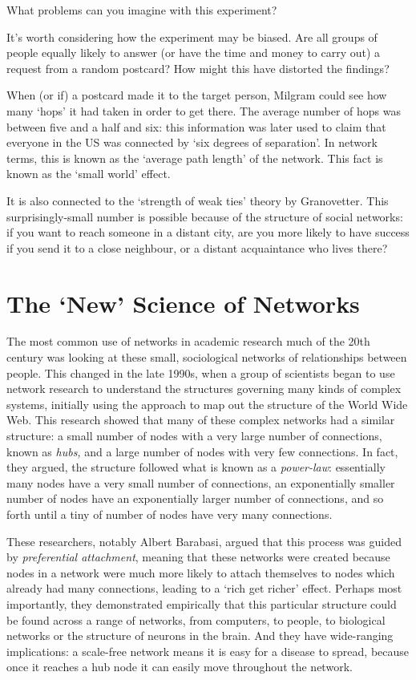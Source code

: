\documentclass[
]{book}
\begin{document}
What problems can you imagine with this experiment?

It's worth considering how the experiment may be biased. Are all groups of people equally likely to answer (or have the time and money to carry out) a request from a random postcard? How might this have distorted the findings?

When (or if) a postcard made it to the target person, Milgram could see how many `hops' it had taken in order to get there. The average number of hops was between five and a half and six: this information was later used to claim that everyone in the US was connected by `six degrees of separation'. In network terms, this is known as the `average path length' of the network. This fact is known as the `small world' effect.

It is also connected to the `strength of weak ties' theory by Granovetter. This surprisingly-small number is possible because of the structure of social networks: if you want to reach someone in a distant city, are you more likely to have success if you send it to a close neighbour, or a distant acquaintance who lives there?

\hypertarget{the-new-science-of-networks}{%
\section{The `New' Science of Networks}\label{the-new-science-of-networks}}

The most common use of networks in academic research much of the 20th century was looking at these small, sociological networks of relationships between people. This changed in the late 1990s, when a group of scientists began to use network research to understand the structures governing many kinds of complex systems, initially using the approach to map out the structure of the World Wide Web. This research showed that many of these complex networks had a similar structure: a small number of nodes with a very large number of connections, known as \emph{hubs,} and a large number of nodes with very few connections. In fact, they argued, the structure followed what is known as a \emph{power-law}: essentially many nodes have a very small number of connections, an exponentially smaller number of nodes have an exponentially larger number of connections, and so forth until a tiny of number of nodes have very many connections.

These researchers, notably Albert Barabasi, argued that this process was guided by \emph{preferential attachment}, meaning that these networks were created because nodes in a network were much more likely to attach themselves to nodes which already had many connections, leading to a `rich get richer' effect. Perhaps most importantly, they demonstrated empirically that this particular structure could be found across a range of networks, from computers, to people, to biological networks or the structure of neurons in the brain. And they have wide-ranging implications: a scale-free network means it is easy for a disease to spread, because once it reaches a hub node it can easily move throughout the network.
\end{document}
